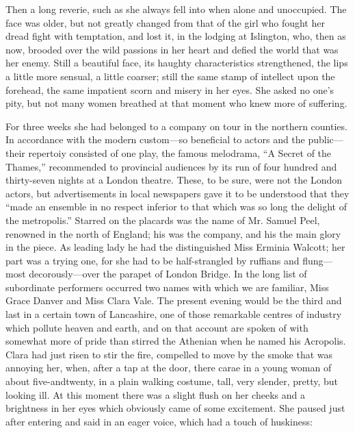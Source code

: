{\protect\hypertarget{197}{}{}}Then a long reverie, such as she always
fell into when alone and unoccupied. The face was older, but not greatly
changed from that of the girl who fought her dread fight with
temptation, and lost it, in the lodging at Islington, who, then as now,
brooded over the wild passions in her heart and defied the world that
was her enemy. Still a beautiful face, its haughty characteristics
strengthened, the lips a little more sensual, a little coarser; still
the same stamp of intellect upon the forehead, the same impatient scorn
and misery in her eyes. She asked no one's pity, but not many women
breathed at that moment who knew more of suffering.

For three weeks she had belonged to a company on tour in the northern
counties. In accordance with the modern custom---so beneficial to actors
and the public---their repertoiy consisted of one play, the famous
melodrama, ``A Secret of the Thames,'' recommended to provincial
audiences by its run of four hundred and thirty-seven nights at a London
theatre. These, to be sure, were {\protect\hypertarget{198}{}{}}not the
London actors, but advertisements in local newspapers gave it to be
understood that they ``made an ensemble in no respect inferior to that
which was so long the delight of the metropolis.'' Starred on the
placards was the name of Mr. Samuel Peel, renowned in the north of
England; his was the company, and his the main glory in the piece. As
leading lady he had the distinguished Miss Erminia Walcott; her part was
a trying one, for she had to be half-strangled by ruffians and
flung---most decorously---over the parapet of London Bridge. In the long
list of subordinate performers occurred two names with which we are
familiar, Miss Grace Danver and Miss Clara Vale. The present evening
would be the third and last in a certain town of Lancashire, one of
those remarkable centres of industry which pollute heaven and earth, and
on that account are spoken of with somewhat more of pride than stirred
the Athenian when he named his Acropolis. Clara had just risen to stir
the fire, compelled to move by the smoke that was
{\protect\hypertarget{199}{}{}}annoying her, when, after a tap at the
door, there carae in a young woman of about five-andtwenty, in a plain
walking costume, tall, very slender, pretty, but looking ill. At this
moment there was a slight flush on her cheeks and a brightness in her
eyes which obviously came of some excitement. She paused just after
entering and said in an eager voice, which had a touch of huskiness:

